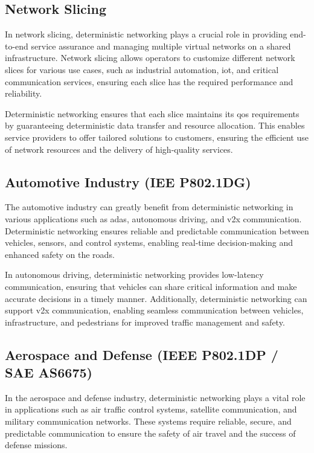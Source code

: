 \documentclass[runningheads]{llncs}
\begin{document}
\subsection{Network Slicing}
In network slicing, deterministic networking plays a crucial role in providing end-to-end service assurance and managing multiple virtual networks on a shared infrastructure. Network slicing allows operators to customize different network slices for various use cases, such as industrial automation, \gls{iot}, and critical communication services, ensuring each slice has the required performance and reliability.

Deterministic networking ensures that each slice maintains its \gls{qos} requirements by guaranteeing deterministic data transfer and resource allocation. This enables service providers to offer tailored solutions to customers, ensuring the efficient use of network resources and the delivery of high-quality services.

\subsection{Automotive Industry (IEE P802.1DG)}
The automotive industry can greatly benefit from deterministic networking in various applications such as \gls{adas}, autonomous driving, and \gls{v2x} communication. Deterministic networking ensures reliable and predictable communication between vehicles, sensors, and control systems, enabling real-time decision-making and enhanced safety on the roads.

In autonomous driving, deterministic networking provides low-latency communication, ensuring that vehicles can share critical information and make accurate decisions in a timely manner. Additionally, deterministic networking can support \gls{v2x} communication, enabling seamless communication between vehicles, infrastructure, and pedestrians for improved traffic management and safety.

\subsection{Aerospace and Defense (IEEE P802.1DP / SAE AS6675)}
In the aerospace and defense industry, deterministic networking plays a vital role in applications such as air traffic control systems, satellite communication, and military communication networks. These systems require reliable, secure, and predictable communication to ensure the safety of air travel and the success of defense missions.
\end{document}
